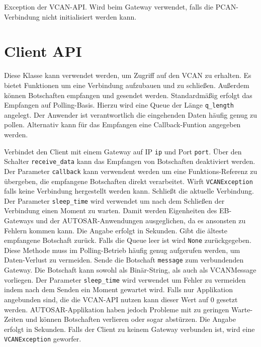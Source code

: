 \begin{description}
    Exception der VCAN-API. Wird beim Gateway verwendet, falls die PCAN-Verbindung nicht initialisiert werden kann.
\end{description}




\section{Client API}
\label{sec:vcan_client_api}

\begin{description}
    Diese Klasse kann verwendet werden, um Zugriff auf den VCAN zu erhalten. Es bietet Funktionen um eine Verbindung aufzubauen und zu schließen. Außerdem können Botschaften empfangen und gesendet werden. Standardmäßig erfolgt das Empfangen auf Polling-Basis. Hierzu wird eine Queue der Länge \texttt{q\_length} angelegt. Der Anwender ist verantwortlich die eingehenden Daten häufig genug zu pollen. Alternativ kann für das Empfangen eine Callback-Funtion angegeben werden.
    \begin{description}
        Verbindet den Client mit einem Gateway auf IP \texttt{ip} und Port \texttt{port}. Über den Schalter \texttt{receive\_data} kann das Empfangen von Botschaften deaktiviert werden. Der Parameter \texttt{callback} kann verwendent werden um eine Funktions-Referenz zu übergeben, die empfangene Botschaften direkt verarbeitet. Wirft \texttt{VCANException} falls keine Verbindung hergestellt werden kann.
        Schließt die aktuelle Verbindung. Der Parameter \texttt{sleep\_time} wird verwendet um nach dem Schließen der Verbindung einen Moment zu warten. Damit werden Eigenheiten des EB-Gateways und der AUTOSAR-Anwendungen ausgeglichen, da es ansonsten zu Fehlern kommen kann. Die Angabe erfolgt in Sekunden.
        Gibt die älteste empfangene Botschaft zurück. Falls die Queue leer ist wird \texttt{None} zurückgegeben. Diese Methode muss im Polling-Betrieb häufig genug aufgerufen werden, um Daten-Verlust zu vermeiden.
        Sende die Botschaft \texttt{message} zum verbundenden Gateway. Die Botschaft kann sowohl als Binär-String, als auch als VCANMessage vorliegen. Der Parameter \texttt{sleep\_time} wird verwendet um Fehler zu vermeiden indem nach dem Senden ein Moment gewartet wird. Falls nur Applikation angebunden sind, die die VCAN-API nutzen kann dieser Wert auf 0 gesetzt werden. AUTOSAR-Applikation haben jedoch Probleme mit zu geringen Warte-Zeiten und können Botschaften verlieren oder sogar abstürzen. Die Angabe erfolgt in Sekunden. Falls der Client zu keinem Gateway verbunden ist, wird eine \texttt{VCANException} geworfer.
    \end{description}
\end{description}

